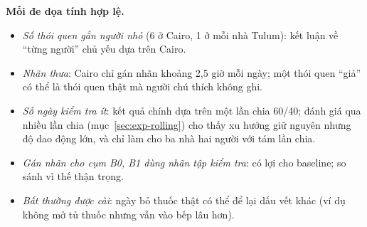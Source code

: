 \textbf{Mối đe dọa tính hợp lệ.}
\begin{itemize}
  \item \emph{Số thói quen gắn người nhỏ} (6 ở Cairo, 1 ở mỗi nhà Tulum): kết luận về ``từng người'' chủ
  yếu dựa trên Cairo.
  \item \emph{Nhãn thưa}: Cairo chỉ gán nhãn khoảng 2,5 giờ mỗi ngày; một thói quen ``giả'' có thể là thói
  quen thật mà người chú thích không ghi.
  \item \emph{Số ngày kiểm tra ít}: kết quả chính dựa trên một lần chia 60/40; đánh giá qua nhiều lần chia
  (mục~\ref{sec:exp-rolling}) cho thấy xu hướng giữ nguyên nhưng độ dao động lớn, và chỉ làm cho ba nhà hai
  người với tám lần chia.
  \item \emph{Gán nhãn cho cụm B0, B1 dùng nhãn tập kiểm tra}: có lợi cho baseline; so sánh vì thế thận trọng.
  \item \emph{Bất thường được cài}: ngày bỏ thuốc thật có thể để lại dấu vết khác (ví dụ không mở tủ thuốc
  nhưng vẫn vào bếp lâu hơn).
\end{itemize}
